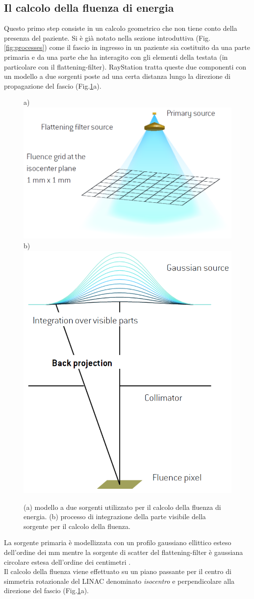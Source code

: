 {\subsection{Il calcolo della fluenza di energia}
\label{sec:fluence}
Questo primo step consiste in un calcolo geometrico che non tiene conto della presenza del paziente. Si è già notato nella sezione introduttiva (Fig.\ref{fig:processes}) come il fascio in ingresso in un paziente sia costituito da una parte primaria e da una parte che ha interagito con gli elementi della testata (in particolare con il flattening-filter). RayStation tratta queste due componenti con un modello a due sorgenti poste ad una certa distanza lungo la direzione di propagazione del fascio (Fig.\ref{fig:twosources}a).
\begin{figure}
\centering
a)\includegraphics[width=.5\textwidth]{./cap1/twosources.png}
b)\includegraphics[width=.4\textwidth]{./cap1/source_int.png}
\caption{(a) modello a due sorgenti utilizzato per il calcolo della fluenza di energia. (b) processo di integrazione della parte visibile della sorgente per il calcolo della fluenza.}
\label{fig:twosources}
\end{figure}
La sorgente primaria è modellizzata con un profilo gaussiano ellittico esteso dell'ordine dei mm mentre la sorgente di scatter del flattening-filter è gaussiana circolare estesa dell'ordine dei centimetri \cite{Chaney1994}.\\
Il calcolo della fluenza viene effettuato su un piano passante per il centro di simmetria rotazionale del LINAC denominato \textit{isocentro} e perpendicolare alla direzione del fascio (Fig.\ref{fig:twosources}a).
}
